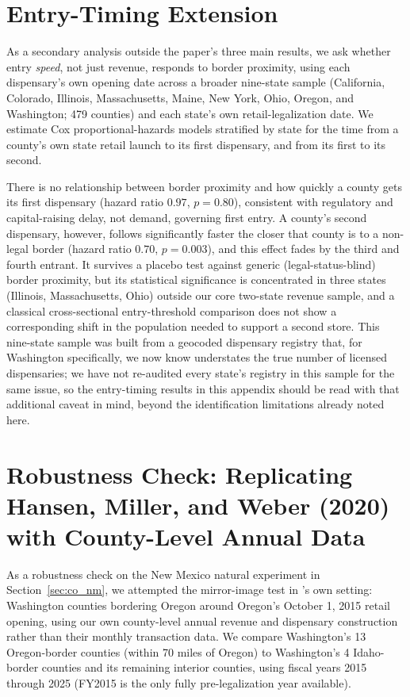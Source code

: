 \documentclass[12pt]{article}
\begin{document}
\appendix

\section{Entry-Timing Extension}
\label{app:entry_timing}

As a secondary analysis outside the paper's three main results, we ask whether entry \emph{speed}, not just
revenue, responds to border proximity, using each dispensary's own opening date across a broader nine-state
sample (California, Colorado, Illinois, Massachusetts, Maine, New York, Ohio, Oregon, and Washington; 479
counties) and each state's own retail-legalization date. We estimate Cox proportional-hazards models
stratified by state for the time from a county's own state retail launch to its first dispensary, and from
its first to its second.



There is no relationship between border proximity and how quickly a county gets its first dispensary
(hazard ratio $0.97$, $p=0.80$), consistent with regulatory and capital-raising delay, not demand, governing
first entry. A county's second dispensary, however, follows significantly faster the closer that county is
to a non-legal border (hazard ratio $0.70$, $p=0.003$), and this effect fades by the third and fourth
entrant. It survives a placebo test against generic (legal-status-blind) border proximity, but its
statistical significance is concentrated in three states (Illinois, Massachusetts, Ohio) outside our core
two-state revenue sample, and a classical cross-sectional entry-threshold comparison does not show a
corresponding shift in the population needed to support a second store. This nine-state sample was built
from a geocoded dispensary registry that, for Washington specifically, we now know understates the true
number of licensed dispensaries; we have not re-audited every state's registry in this sample for the same
issue, so the entry-timing results in this appendix should be read with that additional caveat in mind,
beyond the identification limitations already noted here.

\section{Robustness Check: Replicating Hansen, Miller, and Weber (2020) with County-Level Annual Data}
\label{app:wa_or}

As a robustness check on the New Mexico natural experiment in Section~\ref{sec:co_nm}, we attempted the
mirror-image test in \citet{HansenMillerWeber2020}'s own setting: Washington counties bordering Oregon around
Oregon's October 1, 2015 retail opening, using our own county-level annual revenue and dispensary
construction rather than their monthly transaction data. We compare Washington's 13 Oregon-border counties
(within 70 miles of Oregon) to Washington's 4 Idaho-border counties and its remaining interior counties,
using fiscal years 2015 through 2025 (FY2015 is the only fully pre-legalization year available).
\end{document}
